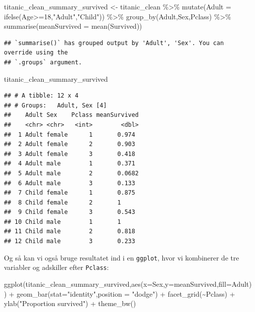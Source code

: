\documentclass[
]{book}
\newenvironment{Shaded}{\begin{snugshade}}{\end{snugshade}}
\newcommand{\AttributeTok}[1]{\textcolor[rgb]{0.77,0.63,0.00}{#1}}
\newcommand{\DecValTok}[1]{\textcolor[rgb]{0.00,0.00,0.81}{#1}}
\newcommand{\FunctionTok}[1]{\textcolor[rgb]{0.00,0.00,0.00}{#1}}
\newcommand{\NormalTok}[1]{#1}
\newcommand{\OtherTok}[1]{\textcolor[rgb]{0.56,0.35,0.01}{#1}}
\newcommand{\SpecialCharTok}[1]{\textcolor[rgb]{0.00,0.00,0.00}{#1}}
\newcommand{\StringTok}[1]{\textcolor[rgb]{0.31,0.60,0.02}{#1}}
\begin{document}
\begin{Shaded}
\begin{Highlighting}[]
\NormalTok{titanic\_clean\_summary\_survived }\OtherTok{\textless{}{-}}\NormalTok{ titanic\_clean }\SpecialCharTok{\%\textgreater{}\%}  
  \FunctionTok{mutate}\NormalTok{(}\AttributeTok{Adult =} \FunctionTok{ifelse}\NormalTok{(Age}\SpecialCharTok{\textgreater{}=}\DecValTok{18}\NormalTok{,}\StringTok{"Adult"}\NormalTok{,}\StringTok{"Child"}\NormalTok{)) }\SpecialCharTok{\%\textgreater{}\%}
  \FunctionTok{group\_by}\NormalTok{(Adult,Sex,Pclass) }\SpecialCharTok{\%\textgreater{}\%} 
  \FunctionTok{summarise}\NormalTok{(}\AttributeTok{meanSurvived =} \FunctionTok{mean}\NormalTok{(Survived))}
\end{Highlighting}
\end{Shaded}

\begin{verbatim}
## `summarise()` has grouped output by 'Adult', 'Sex'. You can override using the
## `.groups` argument.
\end{verbatim}

\begin{Shaded}
\begin{Highlighting}[]
\NormalTok{titanic\_clean\_summary\_survived}
\end{Highlighting}
\end{Shaded}

\begin{verbatim}
## # A tibble: 12 x 4
## # Groups:   Adult, Sex [4]
##    Adult Sex    Pclass meanSurvived
##    <chr> <chr>   <int>        <dbl>
##  1 Adult female      1       0.974 
##  2 Adult female      2       0.903 
##  3 Adult female      3       0.418 
##  4 Adult male        1       0.371 
##  5 Adult male        2       0.0682
##  6 Adult male        3       0.133 
##  7 Child female      1       0.875 
##  8 Child female      2       1     
##  9 Child female      3       0.543 
## 10 Child male        1       1     
## 11 Child male        2       0.818 
## 12 Child male        3       0.233
\end{verbatim}

Og så kan vi også bruge resultatet ind i en \texttt{ggplot}, hvor vi kombinerer de tre variabler og adskiller efter \texttt{Pclass}:

\begin{Shaded}
\begin{Highlighting}[]
\FunctionTok{ggplot}\NormalTok{(titanic\_clean\_summary\_survived,}\FunctionTok{aes}\NormalTok{(}\AttributeTok{x=}\NormalTok{Sex,}\AttributeTok{y=}\NormalTok{meanSurvived,}\AttributeTok{fill=}\NormalTok{Adult)) }\SpecialCharTok{+}
  \FunctionTok{geom\_bar}\NormalTok{(}\AttributeTok{stat=}\StringTok{"identity"}\NormalTok{,}\AttributeTok{position =} \StringTok{"dodge"}\NormalTok{) }\SpecialCharTok{+} 
  \FunctionTok{facet\_grid}\NormalTok{(}\SpecialCharTok{\textasciitilde{}}\NormalTok{Pclass) }\SpecialCharTok{+} 
  \FunctionTok{ylab}\NormalTok{(}\StringTok{"Proportion survived"}\NormalTok{) }\SpecialCharTok{+}
  \FunctionTok{theme\_bw}\NormalTok{()}
\end{Highlighting}
\end{Shaded}
\end{document}
